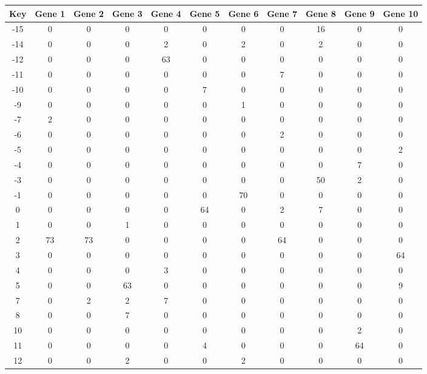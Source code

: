 \begin{tabular}{|c|c|c|c|c|c|c|c|c|c|c|}
\hline
Key & Gene 1 & Gene 2 & Gene 3 & Gene 4 & Gene 5 & Gene 6 & Gene 7 & Gene 8 & Gene 9 & Gene 10 \\
\hline
-15 & 0 & 0 & 0 & 0 & 0 & 0 & 0 & 16 & 0 & 0 \\
-14 & 0 & 0 & 0 & 2 & 0 & 2 & 0 & 2 & 0 & 0 \\
-12 & 0 & 0 & 0 & 63 & 0 & 0 & 0 & 0 & 0 & 0 \\
-11 & 0 & 0 & 0 & 0 & 0 & 0 & 7 & 0 & 0 & 0 \\
-10 & 0 & 0 & 0 & 0 & 7 & 0 & 0 & 0 & 0 & 0 \\
-9 & 0 & 0 & 0 & 0 & 0 & 1 & 0 & 0 & 0 & 0 \\
-7 & 2 & 0 & 0 & 0 & 0 & 0 & 0 & 0 & 0 & 0 \\
-6 & 0 & 0 & 0 & 0 & 0 & 0 & 2 & 0 & 0 & 0 \\
-5 & 0 & 0 & 0 & 0 & 0 & 0 & 0 & 0 & 0 & 2 \\
-4 & 0 & 0 & 0 & 0 & 0 & 0 & 0 & 0 & 7 & 0 \\
-3 & 0 & 0 & 0 & 0 & 0 & 0 & 0 & 50 & 2 & 0 \\
-1 & 0 & 0 & 0 & 0 & 0 & 70 & 0 & 0 & 0 & 0 \\
0 & 0 & 0 & 0 & 0 & 64 & 0 & 2 & 7 & 0 & 0 \\
1 & 0 & 0 & 1 & 0 & 0 & 0 & 0 & 0 & 0 & 0 \\
2 & 73 & 73 & 0 & 0 & 0 & 0 & 64 & 0 & 0 & 0 \\
3 & 0 & 0 & 0 & 0 & 0 & 0 & 0 & 0 & 0 & 64 \\
4 & 0 & 0 & 0 & 3 & 0 & 0 & 0 & 0 & 0 & 0 \\
5 & 0 & 0 & 63 & 0 & 0 & 0 & 0 & 0 & 0 & 9 \\
7 & 0 & 2 & 2 & 7 & 0 & 0 & 0 & 0 & 0 & 0 \\
8 & 0 & 0 & 7 & 0 & 0 & 0 & 0 & 0 & 0 & 0 \\
10 & 0 & 0 & 0 & 0 & 0 & 0 & 0 & 0 & 2 & 0 \\
11 & 0 & 0 & 0 & 0 & 4 & 0 & 0 & 0 & 64 & 0 \\
12 & 0 & 0 & 2 & 0 & 0 & 2 & 0 & 0 & 0 & 0 \\
\hline
\end{tabular}